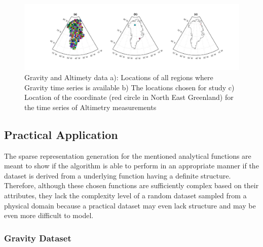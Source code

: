 \documentclass[procedia]{easychair}
\begin{document}
\begin{figure}[]  %
	\centering
	\includegraphics[width=6.5in]{grace_alt.jpg}
	\caption[Optional caption]{Gravity and Altimety data a): Locations of all regions where Gravity time series is available b) The locations chosen for study c) Location of the coordinate (red circle in North East Greenland) for the time series of Altimetry measurements }
	\label{fig2} %
\end{figure}




\subsection{Practical Application}

The sparse representation generation for the mentioned analytical functions are meant to show if the algorithm is able to perform in an appropriate manner if the dataset is derived from a underlying function having a definite structure. Therefore, although these chosen functions are sufficiently complex based on their attributes, they lack the complexity level of a random dataset sampled from a physical domain because a practical dataset may even lack structure and may be even more difficult to model. 

\subsubsection{Gravity Dataset}
\end{document}
